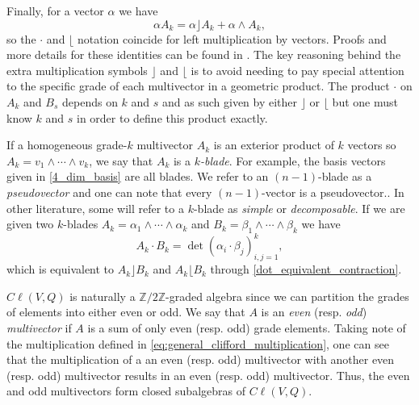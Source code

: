 \documentclass[12pt]{article}
\begin{document}
Finally, for a vector $\alpha$ we have
\begin{equation}
\alpha A_k = \alpha \rfloor A_k + \alpha \wedge A_k,
\end{equation}
so the $\cdot$ and $\lfloor$ notation coincide for left multiplication by vectors. Proofs and more details for these identities can be found in \cite{chisolm_geometric_2012}. The key reasoning behind the extra multiplication symbols $\rfloor$ and $\lfloor$ is to avoid needing to pay special attention to the specific grade of each multivector in a geometric product.  The product $\cdot$ on $A_k$ and $B_s$ depends on $k$ and $s$ and as such given by either $\rfloor$ or $\lfloor$ but one must know $k$ and $s$ in order to define this product exactly.  


If a homogeneous grade-$k$ multivector $A_k$ is an exterior product of $k$ vectors so $A_k = v_1 \wedge \cdots \wedge v_k$, we say that $A_k$ is a \emph{$k$-blade}. For example, the basis vectors given in \ref{4_dim_basis} are all blades. We refer to an $(n-1)$-blade as a \emph{pseudovector} and one can note that every $(n-1)$-vector is a pseudovector.. In other literature, some will refer to a $k$-blade as \emph{simple} or \emph{decomposable}. If we are given two $k$-blades $A_k = \alpha_1 \wedge \cdots \wedge \alpha_k$ and $B_k = \beta_1 \wedge \cdots \wedge \beta_k$ we have 
\begin{equation}
\label{eq:dot_product}
A_k \cdot B_k = \det(\alpha_i \cdot \beta_j )_{i,j=1}^k,
\end{equation}
which is equivalent to $A_k \rfloor B_k$ and $A_k \lfloor B_k$ through \ref{dot_equivalent_contraction}. 

$C\ell(V,Q)$ is naturally a $\mathbb{Z}/2\mathbb{Z}$-graded algebra since we can partition the grades of elements into either even or odd.  We say that $A$ is an \emph{even} (resp. \emph{odd}) \emph{multivector} if $A$ is a sum of only even (resp. odd) grade elements.  Taking note of the multiplication defined in \ref{eq:general_clifford_multiplication}, one can see that the multiplication of a an even (resp. odd) multivector with another even (resp. odd) multivector results in an even (resp. odd) multivector.  Thus, the even and odd multivectors form closed subalgebras of $C\ell(V,Q)$.
\end{document}
